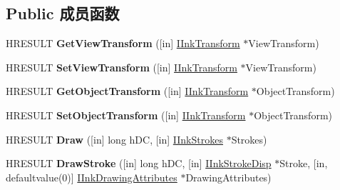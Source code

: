 \subsection*{Public 成员函数}
\begin{DoxyCompactItemize}
\item 
\mbox{\label{interface_m_s_i_n_k_a_u_t_lib_1_1_i_ink_renderer_a3f122128c5b38efb41b08d36d80c5d8f}} 
H\+R\+E\+S\+U\+LT {\bfseries Get\+View\+Transform} (\mbox{[}in\mbox{]} \hyperlink{interface_m_s_i_n_k_a_u_t_lib_1_1_i_ink_transform}{I\+Ink\+Transform} $\ast$View\+Transform)
\item 
\mbox{\label{interface_m_s_i_n_k_a_u_t_lib_1_1_i_ink_renderer_aac512a4c92bdd5fb428d13bacf8b01d7}} 
H\+R\+E\+S\+U\+LT {\bfseries Set\+View\+Transform} (\mbox{[}in\mbox{]} \hyperlink{interface_m_s_i_n_k_a_u_t_lib_1_1_i_ink_transform}{I\+Ink\+Transform} $\ast$View\+Transform)
\item 
\mbox{\label{interface_m_s_i_n_k_a_u_t_lib_1_1_i_ink_renderer_a5999d8a4e4261865c928e58ec14d89d1}} 
H\+R\+E\+S\+U\+LT {\bfseries Get\+Object\+Transform} (\mbox{[}in\mbox{]} \hyperlink{interface_m_s_i_n_k_a_u_t_lib_1_1_i_ink_transform}{I\+Ink\+Transform} $\ast$Object\+Transform)
\item 
\mbox{\label{interface_m_s_i_n_k_a_u_t_lib_1_1_i_ink_renderer_aaf392197362992dbc24df9e9fa1d208b}} 
H\+R\+E\+S\+U\+LT {\bfseries Set\+Object\+Transform} (\mbox{[}in\mbox{]} \hyperlink{interface_m_s_i_n_k_a_u_t_lib_1_1_i_ink_transform}{I\+Ink\+Transform} $\ast$Object\+Transform)
\item 
\mbox{\label{interface_m_s_i_n_k_a_u_t_lib_1_1_i_ink_renderer_a997c970e295b749024a447c4ea06bbc1}} 
H\+R\+E\+S\+U\+LT {\bfseries Draw} (\mbox{[}in\mbox{]} long h\+DC, \mbox{[}in\mbox{]} \hyperlink{interface_m_s_i_n_k_a_u_t_lib_1_1_i_ink_strokes}{I\+Ink\+Strokes} $\ast$Strokes)
\item 
\mbox{\label{interface_m_s_i_n_k_a_u_t_lib_1_1_i_ink_renderer_af9cb1ccdceb5364b6290bbf9323a2c7b}} 
H\+R\+E\+S\+U\+LT {\bfseries Draw\+Stroke} (\mbox{[}in\mbox{]} long h\+DC, \mbox{[}in\mbox{]} \hyperlink{interface_m_s_i_n_k_a_u_t_lib_1_1_i_ink_stroke_disp}{I\+Ink\+Stroke\+Disp} $\ast$Stroke, \mbox{[}in, defaultvalue(0)\mbox{]} \hyperlink{interface_m_s_i_n_k_a_u_t_lib_1_1_i_ink_drawing_attributes}{I\+Ink\+Drawing\+Attributes} $\ast$Drawing\+Attributes)

\end{DoxyCompactItemize}
